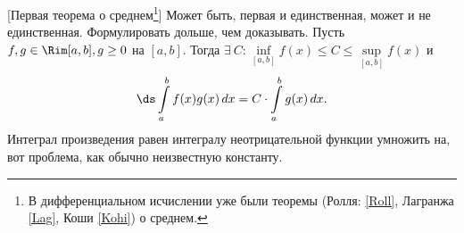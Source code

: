 [Первая теорема о среднем\footnote{В дифференциальном исчислении уже были теоремы (Ролля: \ref{Roll}, Лагранжа \ref{Lag}, Коши \ref{Kohi}) о среднем.}]
 	\label{FirTheMid}Может быть, первая и единственная, может и не единственная. Формулировать дольше, чем доказывать. Пусть $f,g\in\Rim[a,b], g\geq0$ на $[a,b]$. Тогда
 	$\exists\  C\colon\inf\limits_{[a,b]}f(x)\leq C\leq \sup\limits_{[a,b]}f(x)$ и
 	$$\ds\int\limits_a^bf(x)g(x)\,dx=C\cdot\int\limits_a^bg(x)\,dx.$$
 	Интеграл произведения равен интегралу неотрицательной функции умножить на, вот проблема, как обычно неизвестную константу.
 	